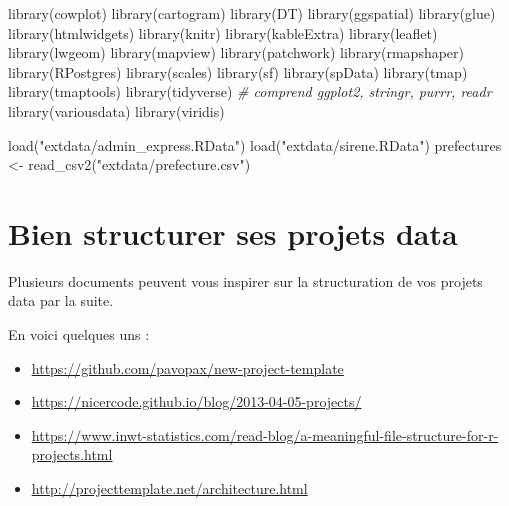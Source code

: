 \documentclass[
]{book}
\newenvironment{Shaded}{\begin{snugshade}}{\end{snugshade}}
\newcommand{\CommentTok}[1]{\textcolor[rgb]{0.56,0.35,0.01}{\textit{#1}}}
\newcommand{\FunctionTok}[1]{\textcolor[rgb]{0.00,0.00,0.00}{#1}}
\newcommand{\NormalTok}[1]{#1}
\newcommand{\OtherTok}[1]{\textcolor[rgb]{0.56,0.35,0.01}{#1}}
\newcommand{\StringTok}[1]{\textcolor[rgb]{0.31,0.60,0.02}{#1}}
\providecommand{\tightlist}{%
  \setlength{\itemsep}{0pt}\setlength{\parskip}{0pt}}
\begin{document}
\begin{Shaded}
\begin{Highlighting}[]
\FunctionTok{library}\NormalTok{(cowplot)}
\FunctionTok{library}\NormalTok{(cartogram)}
\FunctionTok{library}\NormalTok{(DT)}
\FunctionTok{library}\NormalTok{(ggspatial)}
\FunctionTok{library}\NormalTok{(glue)}
\FunctionTok{library}\NormalTok{(htmlwidgets)}
\FunctionTok{library}\NormalTok{(knitr)}
\FunctionTok{library}\NormalTok{(kableExtra)}
\FunctionTok{library}\NormalTok{(leaflet)}
\FunctionTok{library}\NormalTok{(lwgeom)}
\FunctionTok{library}\NormalTok{(mapview)}
\FunctionTok{library}\NormalTok{(patchwork)}
\FunctionTok{library}\NormalTok{(rmapshaper)}
\FunctionTok{library}\NormalTok{(RPostgres)}
\FunctionTok{library}\NormalTok{(scales)}
\FunctionTok{library}\NormalTok{(sf)}
\FunctionTok{library}\NormalTok{(spData)}
\FunctionTok{library}\NormalTok{(tmap)}
\FunctionTok{library}\NormalTok{(tmaptools)}
\FunctionTok{library}\NormalTok{(tidyverse) }\CommentTok{\# comprend ggplot2, stringr, purrr, readr}
\FunctionTok{library}\NormalTok{(variousdata)}
\FunctionTok{library}\NormalTok{(viridis)}

\FunctionTok{load}\NormalTok{(}\StringTok{"extdata/admin\_express.RData"}\NormalTok{)}
\FunctionTok{load}\NormalTok{(}\StringTok{"extdata/sirene.RData"}\NormalTok{)}
\NormalTok{prefectures }\OtherTok{\textless{}{-}} \FunctionTok{read\_csv2}\NormalTok{(}\StringTok{"extdata/prefecture.csv"}\NormalTok{)}
\end{Highlighting}
\end{Shaded}

\hypertarget{bien-structurer-ses-projets-data}{%
\section{Bien structurer ses projets data}\label{bien-structurer-ses-projets-data}}

Plusieurs documents peuvent vous inspirer sur la structuration de vos projets data par la suite.

En voici quelques uns :

\begin{itemize}
\tightlist
\item
  \url{https://github.com/pavopax/new-project-template}
\item
  \url{https://nicercode.github.io/blog/2013-04-05-projects/}
\item
  \url{https://www.inwt-statistics.com/read-blog/a-meaningful-file-structure-for-r-projects.html}
\item
  \url{http://projecttemplate.net/architecture.html}
\end{itemize}
\end{document}
